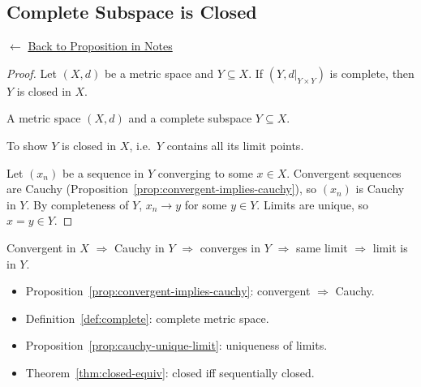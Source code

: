 
\subsection*{Complete Subspace is Closed}
\label{prf:complete-subspace-closed}

\begin{remark*}[Return]
$\leftarrow$ \hyperref[prop:complete-subspace-closed]{Back to Proposition in Notes}
\end{remark*}

\begin{proof}
\Claim Let $(X,d)$ be a metric space and $Y \subseteq X$.
If $(Y, d|_{Y \times Y})$ is complete, then $Y$ is closed in $X$.

\Given A metric space $(X,d)$ and a complete subspace $Y \subseteq X$.

\Goal To show $Y$ is closed in $X$, i.e.\ $Y$ contains all its limit points.

\Strategy Let $(x_n)$ be a sequence in $Y$ converging to some $x \in X$.
Convergent sequences are Cauchy (Proposition~\ref{prop:convergent-implies-cauchy}),
so $(x_n)$ is Cauchy in $Y$.
By completeness of $Y$, $x_n \to y$ for some $y \in Y$.
Limits are unique, so $x = y \in Y$.


\end{proof}

\begin{remark*}
Convergent in $X$ $\Rightarrow$ Cauchy in $Y$ $\Rightarrow$ converges in $Y$
$\Rightarrow$ same limit $\Rightarrow$ limit is in $Y$.
\end{remark*}

\begin{remark*}[Dependencies]
\begin{itemize}
  \item Proposition~\ref{prop:convergent-implies-cauchy}: convergent $\Rightarrow$ Cauchy.
  \item Definition~\ref{def:complete}: complete metric space.
  \item Proposition~\ref{prop:cauchy-unique-limit}: uniqueness of limits.
  \item Theorem~\ref{thm:closed-equiv}: closed iff sequentially closed.
\end{itemize}
\end{remark*}
